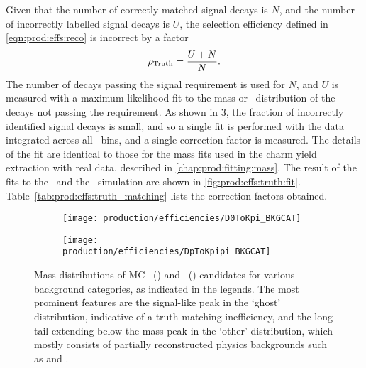Given that the number of correctly matched signal decays is $N$, and the number
of incorrectly labelled signal decays is $U$, the selection efficiency defined
in \cref{eqn:prod:effs:reco} is incorrect by a factor
\begin{equation}
  \rho_{\textnormal{Truth}} = \frac{U+N}{N}.
  \label{eqn:prod:effs:truth}
\end{equation}
The number of decays passing the signal requirement is used for $N$, and $U$ is
measured with a maximum likelihood fit to the mass or \deltam\ distribution of
the decays not passing the requirement.
As shown in \cref{fig:prod:effs:truth:categories}, the fraction of incorrectly
identified signal decays is small, and so a single fit is performed with the
data integrated across all \pTy\ bins, and a single correction factor is
measured.
The details of the fit are identical to those for the mass fits used in the
charm yield extraction with real data, described in
\cref{chap:prod:fitting:mass}.
The result of the fits to the \DzToKpi\ and the \DpToKpipi\ simulation are
shown in \cref{fig:prod:effs:truth:fit}.
Table~\ref{tab:prod:effs:truth_matching} lists the correction factors obtained.

\begin{figure}
  \begin{subfigure}[b]{0.5\textwidth}
    \centering
    \texttt{[image: production/efficiencies/D0ToKpi\_BKGCAT]}
    \caption{\PDzero}
    \label{fig:prod:effs:truth:categories:D0ToKpi}
  \end{subfigure}
  \begin{subfigure}[b]{0.5\textwidth}
    \centering
    \texttt{[image: production/efficiencies/DpToKpipi\_BKGCAT]}
    \caption{\PDplus}
    \label{fig:prod:effs:truth:categories:DpToKpipi}
  \end{subfigure}
  \caption{%
    Mass distributions of \ac{MC}
    \PDzero~() and
    \PDplus~() candidates for
    various background categories, as indicated in the legends.
    The most prominent features are the signal-like peak in the `ghost'
    distribution, indicative of a truth-matching inefficiency, and the long
    tail extending below the mass peak in the `other' distribution, which
    mostly consists of partially reconstructed physics backgrounds such as
    \decay{\PDzero}{\PKminus\Ppiplus\Ppizero} and
    \decay{\PDplus}{\PKminus\Ppiplus\Ppiplus\Ppizero}.
  }
  \label{fig:prod:effs:truth:categories}
\end{figure}

